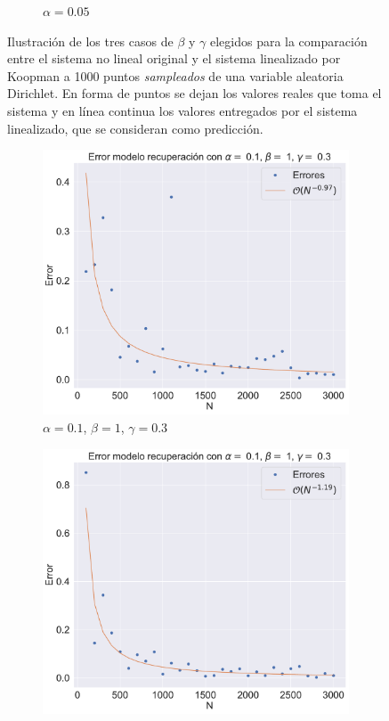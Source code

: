 \begin{figure}[h]
\begin{subfigure}[b]{0.45\textwidth}
        \caption{$\alpha=0.05$}
    \end{subfigure}
    \caption{Ilustración de los tres casos de $\beta$ y $\gamma$ elegidos para la comparación entre el sistema no lineal original y el sistema linealizado por Koopman a 1000 puntos \textit{sampleados} de una variable aleatoria Dirichlet. En forma de puntos se dejan los valores reales que toma el sistema y en línea continua los valores entregados por el sistema linealizado, que se consideran como predicción.}
    \label{fig:Comp_traj_SIR}
\end{figure}
\begin{figure}[h]
    \centering
    \begin{subfigure}[b]{0.32\textwidth}
        \centering
        \includegraphics[width=\textwidth]{img/content/chapter3/SIR_rec1Errors.pdf}
        \caption{$\alpha=0.1$, $\beta=1$, $\gamma=0.3$}
    \end{subfigure}
    \hfill
    \begin{subfigure}[b]{0.32\textwidth}
        \centering
        \includegraphics[width=\textwidth]{img/content/chapter3/SIR_rec2Errors.pdf}

\end{subfigure}
\end{figure}
